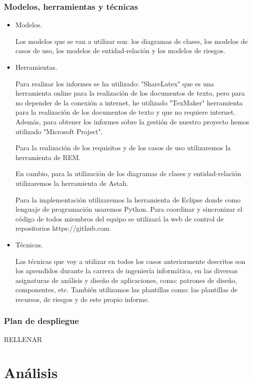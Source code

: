 \documentclass[a4paper,11pt, twoside]{article}
\begin{document}
\subsubsection{Modelos, herramientas y técnicas}
\begin{itemize}[noitemsep,topsep=0pt]
\item Modelos.

\quad Los modelos que se van a utilizar son: los diagramas de clases, los modelos de casos de uso, los modelos de entidad-relación y los modelos de riesgos. 

\item Herramientas.

\quad Para realizar los informes se ha utilizado: "ShareLatex" que es una herramienta online para la realización de los documentos de texto, pero para no depender de la conexión a internet, he utilizado "TexMaker" herramienta para la realización de los documentos de texto y que no requiere internet. Además, para obtener los informes sobre la gestión de nuestro proyecto hemos utilizado "Microsoft Project".

\quad Para la realización de los requisitos y de los casos de uso utilizaremos la herramienta de REM.

\quad En cambio, para la utilización de los diagramas de clases y entidad-relación utilizaremos la herramienta de Astah.

\quad Para la implementación utilizaremos la herramienta de Eclipse donde como lenguaje de programación usaremos Python. Para coordinar y sincronizar el código de todos miembros del equipo se utilizará la web de control de repositorios https://github.com

\item Técnicas.

\quad Las técnicas que voy a utilizar en todos los casos anteriormente descritos son los aprendidos durante la carrera de ingeniería informática, en las diversas asignaturas de análisis y diseño de aplicaciones, como: patrones de diseño, componentes, etc. También utilizamos las plantillas como: las plantillas de recursos, de riesgos y de este propio informe.

\end{itemize}
\subsubsection{Plan de despliegue}
{\color{red} RELLENAR }
\section{Análisis}
\end{document}
